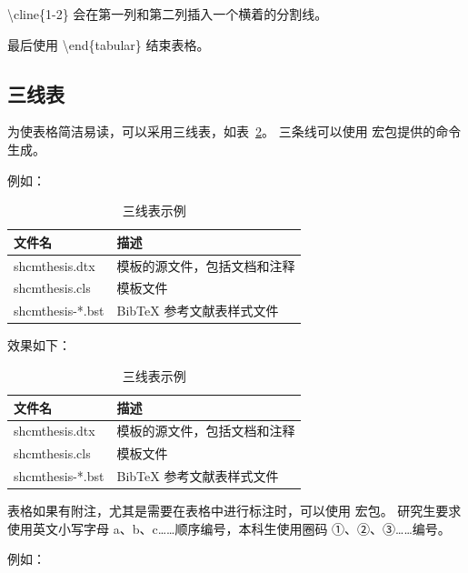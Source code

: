 \textbackslash cline\{1-2\} 会在第一列和第二列插入一个横着的分割线。

最后使用 \textbackslash end\{tabular\} 结束表格。

\subsection{三线表}

为使表格简洁易读，可以采用三线表，如表~\ref{tab:three-line}。
三条线可以使用  宏包提供的命令生成。

例如：

\begin{python}
\begin{table}
	\centering
	\caption{三线表示例}
	\begin{tabular}{ll}
		\toprule
		文件名          & 描述                         \\
		\midrule
		shcmthesis.dtx   & 模板的源文件，包括文档和注释 \\
		shcmthesis.cls   & 模板文件                     \\
		shcmthesis-*.bst & BibTeX 参考文献表样式文件    \\
		\bottomrule
	\end{tabular}
	\label{tab:three-line}
\end{table}
\end{python}

效果如下：

\begin{table}[H]
	\centering
	\caption{三线表示例}
	\begin{tabular}{ll}
		\toprule
		文件名          & 描述                         \\
		\midrule
		shcmthesis.dtx   & 模板的源文件，包括文档和注释 \\
		shcmthesis.cls   & 模板文件                     \\
		shcmthesis-*.bst & BibTeX 参考文献表样式文件    \\
		\bottomrule
	\end{tabular}
	\label{tab:three-line}
\end{table}

表格如果有附注，尤其是需要在表格中进行标注时，可以使用  宏包。
研究生要求使用英文小写字母 a、b、c……顺序编号，本科生使用圈码 ①、②、③……编号。

例如：

